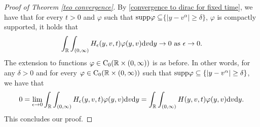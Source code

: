 \documentclass[11pt]{article}
\numberwithin{equation}{section}
\newcommand{\supp}{\textup{supp}}
\newcommand{\der}{\textup{d}}
\begin{document}
\begin{proof}[Proof of Theorem \ref{teo convergence}]
By \eqref{convergence to dirac for fixed time}, we have that for every $t>0$ and $\varphi$ such that $\supp \varphi\subseteq $$\{|y-v^{\alpha}|\geq \delta\}$, $\varphi$ is compactly supported, it holds that
\begin{align}
    \int_{\mathbb{R}}\int_{(0,\infty)}H_{\epsilon}(y,v,t)\varphi(y,v)\der v \der y\rightarrow 0 \textup{ as } \epsilon\rightarrow 0.
\end{align}The extension to functions $\varphi\in\textup{C}_{0}(\mathbb{R}\times(0,\infty))$ is as before. In other words, for any $\delta>0$ and for every  $\varphi\in\textup{C}_{0}(\mathbb{R}\times(0,\infty))$ such that $\supp \varphi\subseteq \{|y-v^{\alpha}|\geq \delta\}$, we have that
\begin{align*}
 0=  \lim_{\epsilon\rightarrow 0} \int_{\mathbb{R}}\int_{(0,\infty)}H_{\epsilon}(y,v,t)\varphi(y,v)\der v \der y= \int_{\mathbb{R}}\int_{(0,\infty)}H(y,v,t)\varphi(y,v)\der v \der y. 
\end{align*}
This concludes our proof.
\end{proof}
\appendix
\end{document}
